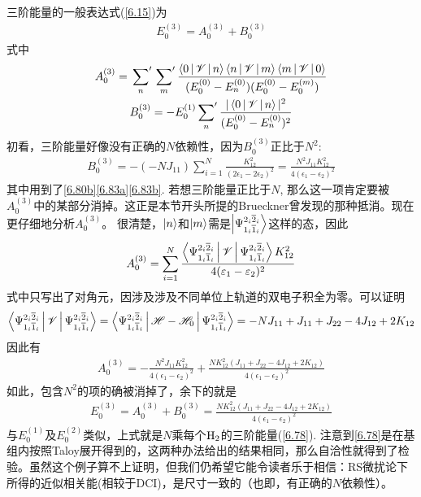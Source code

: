 三阶能量的一般表达式(\eqref{6.15})为
\begin{align}
E_0^{(3)} = A_0^{(3)} + B_{0}^{(3)}
\end{align}
式中
\begin{gather}
A_0^{(3)} = \sideset{}{'}\sum_n \sideset{}{'}\sum_m \frac{\Braket{0|\mathscr{V}|n}\Braket{n|\mathscr{V}|m}\Braket{m|\mathscr{V}|0}}{(E_0^{(0)} - E_n^{(0)}) (E_0^{(0)} - E_0^{(m)}) }\\
B_0^{(3)} = -E_0^{(1)}\sideset{}{'}{\sum}_n\frac{|\Braket{0|\mathscr{V}|n}|^2}{(E_0^{(0)} - E_n^{(0)})^2}
\end{gather}
初看，三阶能量好像没有正确的$N$依赖性，因为$B_0^{(3)}$正比于$N^2$:
\begin{align}
B_0^{(3)} = -(-NJ_{11}) \sum_{i=1}^{N} \frac{K_{12}^2}{(2\epsilon_1 - 2\epsilon_2)^2} = \frac{N^2J_{11}K_{12}^2}{4(\epsilon_1-\epsilon_2)^2}
\end{align}
其中用到了\eqref{6.80b}\eqref{6.83a}\eqref{6.83b}. 若想三阶能量正比于$N$, 那么这一项肯定要被$A_0^{(3)}$中的某部分消掉。这正是本节开头所提的Brueckner曾发现的那种抵消。现在更仔细地分析$A_0^{(3)}$。 很清楚，$\Ket{n}$和$\Ket{m}$需是$\Ket{\Psi_{1_i\overline{1}_i}^{2_i\overline{2}_i}}$这样的态，因此
\begin{align}
A_0^{(3)} = \sum_{i=1}^{N} \frac{\Braket{\Psi_{1_i\overline{1}_i}^{2_i\overline{2}_i}|\mathscr{V}|\Psi_{1_i\overline{1}_i}^{2_i\overline{2}_i}}K_{12}^2}{4(\varepsilon_1 - \varepsilon_2)^2}
\end{align}
式中只写出了对角元，因涉及涉及不同单位上轨道的双电子积全为零。可以证明
\begin{align}\Braket{\Psi_{1_i\overline{1}_i}^{2_i\overline{2}_i}|\mathscr{V}|\Psi_{1_i\overline{1}_i}^{2_i\overline{2}_i}} = \Braket{\Psi_{1_i\overline{1}_i}^{2_i\overline{2}_i}|\mathscr{H}-\mathscr{H}_0|\Psi_{1_i\overline{1}_i}^{2_i\overline{2}_i}}=-NJ_{11} + J_{11} + J_{22} - 4J_{12} + 2K_{12}
\label{6.90}
\end{align}
因此有
\begin{align}
A_0^{(3)} = - \frac{N^2J_{11}K_{12}^2}{4(\epsilon_1 - \epsilon_2)^2} + \frac{NK_{12}^2(J_{11} + J_{22} - 4J_{12} + 2K_{12})}{4(\epsilon_1 - \epsilon_2)^2}
\end{align}
如此，包含$N^2$的项的确被消掉了，余下的就是
\begin{align}
E_0^{(3)} = A_0^{(3)} + B_0^{(3)} = \frac{NK_{12}^2(J_{11} + J_{22} - 4J_{12} + 2K_{12})}{4(\epsilon_1 - \epsilon_2)^2}
\end{align}
与$E_0^{(1)}$及$E_0^{(2)}$类似，上式就是$N$乘每个$\mathrm{H}_2$的三阶能量(\eqref{6.78}). 注意到\eqref{6.78}是在基组内按照Taloy展开得到的，这两种办法给出的结果相同，那么自洽性就得到了检验。虽然这个例子算不上证明，但我们仍希望它能令读者乐于相信：RS微扰论下所得的近似相关能(相较于DCI)，是尺寸一致的（也即，有正确的$N$依赖性）。
